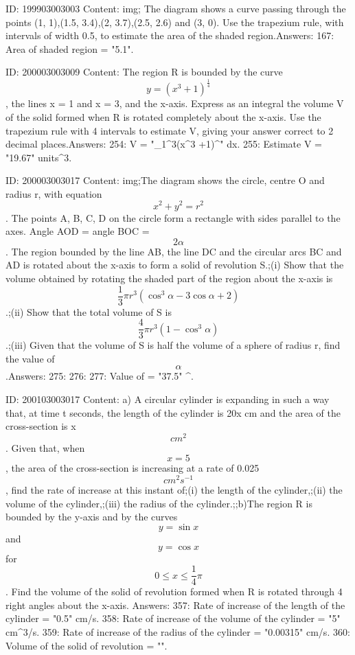 \documentclass{article}
\begin{document}
ID: 199903003003
Content:
img; The diagram shows a curve passing through the points (1, 1),(1.5, 3.4),(2, 3.7),(2.5, 2.6) and (3, 0). Use the trapezium rule, with intervals of width 0.5, to estimate the area of the shaded region.Answers:
167: Area of shaded region = "5.1".

ID: 200003003009
Content:
The region R is bounded by the curve \[y = (x^3 + 1)^{\frac{1}{4}}\], the lines x = 1 and x = 3, and the x-axis. Express as an integral the volume V of the solid formed when R is rotated completely about the x-axis. Use the trapezium rule with 4 intervals to estimate V, giving your answer correct to 2 decimal places.Answers:
254: V = "\pi\int_1^3(x^3 +1)^{}" dx.
255: Estimate V = "19.67" units^3.

ID: 200003003017
Content:
img;The diagram shows the circle, centre O and radius r, with equation \[x^2 + y^2 = r^2\]. The points A, B, C, D on the circle form a rectangle with sides parallel to the axes. Angle AOD = angle BOC = \[2\alpha\]. The region bounded by the line AB, the line DC and the circular arcs BC and AD is rotated about the x-axis to form a solid of revolution S.;(i) Show that the volume obtained by rotating the shaded part of the region about the x-axis is \[\frac{1}{3} \pi r^3 (\cos^3 \alpha - 3\cos \alpha + 2)\].;(ii) Show that the total volume of S is \[\frac{4}{3} \pi r^3 (1 - \cos^3 \alpha)\].;(iii) Given that the volume of S is half the volume of a sphere of radius r, find the value of \[\alpha\].Answers:
275: 
276: 
277: Value of \alpha = "37.5" { }^{\circ}.

ID: 200103003017
Content:
a) A circular cylinder is expanding in such a way that, at time t seconds, the length of the cylinder is 20x cm and the area of the cross-section is  x $$cm^2$$. Given that, when $$x = 5$$, the area of the cross-section is increasing at a rate of 0.025 $$cm^2 s^{-1}$$, find the rate of increase at this instant of;(i) the length of the cylinder,;(ii) the volume of the cylinder,;(iii) the radius of the cylinder.;;b)The region R is bounded by the y-axis and by the curves $$y = \sin{x}$$ and $$y = \cos{x}$$ for  \[0 \le x \le \frac{1}{4}\pi\]. Find the volume of the solid of revolution formed when R is rotated through 4 right angles about the x-axis. Answers:
357: Rate of increase of the length of the cylinder = "0.5" cm/s.
358: Rate of increase of the volume of the cylinder = "5" cm^3/s.
359: Rate of increase of the radius of the cylinder = "0.00315" cm/s.
360: Volume of the solid of revolution = "".
\end{document}
